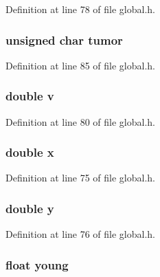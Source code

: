 Definition at line 78 of file global.\-h.

\hypertarget{structcellData_a49af8c5336d6c2401bc24f86dbb97b36}{
\subsubsection[{tumor}]{\setlength{\rightskip}{0pt plus 5cm}unsigned char tumor}}\label{structcellData_a49af8c5336d6c2401bc24f86dbb97b36}


Definition at line 85 of file global.\-h.

\hypertarget{structcellData_a3b90d5a73541ab9402511d87bed076ef}{
\subsubsection[{v}]{\setlength{\rightskip}{0pt plus 5cm}double v}}\label{structcellData_a3b90d5a73541ab9402511d87bed076ef}


Definition at line 80 of file global.\-h.

\hypertarget{structcellData_af88b946fb90d5f08b5fb740c70e98c10}{
\subsubsection[{x}]{\setlength{\rightskip}{0pt plus 5cm}double x}}\label{structcellData_af88b946fb90d5f08b5fb740c70e98c10}


Definition at line 75 of file global.\-h.

\hypertarget{structcellData_ab927965981178aa1fba979a37168db2a}{
\subsubsection[{y}]{\setlength{\rightskip}{0pt plus 5cm}double y}}\label{structcellData_ab927965981178aa1fba979a37168db2a}


Definition at line 76 of file global.\-h.

\hypertarget{structcellData_ad0bd87a264e65d1c17ecc07049819f2c}{
\subsubsection[{young}]{\setlength{\rightskip}{0pt plus 5cm}float young}}\label{structcellData_ad0bd87a264e65d1c17ecc07049819f2c}


